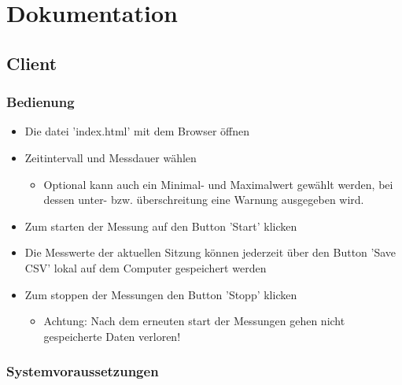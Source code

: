 \documentclass[11pt]{scrartcl}
\begin{document}
\section{Dokumentation}

\subsection{Client}

\subsubsection{Bedienung}

\begin{itemize}
	\item Die datei 'index.html' mit dem Browser \"offnen
	\item Zeitintervall und Messdauer wählen
	\begin{itemize}
		\item Optional kann auch ein Minimal- und Maximalwert gew\"ahlt werden, bei dessen unter- bzw. \"uberschreitung eine Warnung ausgegeben wird.
	\end{itemize}
	\item Zum starten der Messung auf den Button 'Start' klicken
	\item Die Messwerte der aktuellen Sitzung k\"onnen jederzeit \"uber den Button 'Save CSV' lokal auf dem Computer gespeichert werden
	\item Zum stoppen der Messungen den Button 'Stopp' klicken
	\begin{itemize}
		\item Achtung: Nach dem erneuten start der Messungen gehen nicht gespeicherte Daten verloren!
	\end{itemize}
\end{itemize}

\subsubsection{Systemvoraussetzungen}
\end{document}
